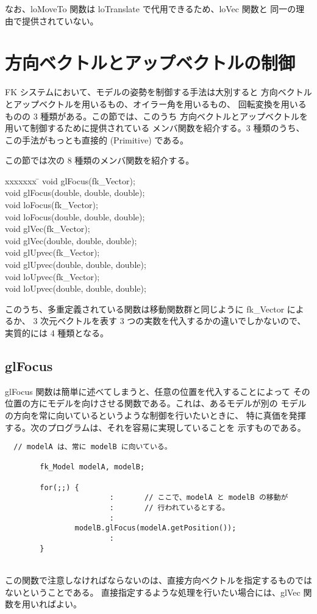 なお、loMoveTo 関数は loTranslate で代用できるため、loVec 関数と
同一の理由で提供されていない。
\section{方向ベクトルとアップベクトルの制御}
FK システムにおいて、モデルの姿勢を制御する手法は大別すると
方向ベクトルとアップベクトルを用いるもの、オイラー角を用いるもの、
回転変換を用いるものの 3 種類がある。この節では、このうち
方向ベクトルとアップベクトルを用いて制御するために提供されている
メンバ関数を紹介する。3 種類のうち、この手法がもっとも直接的
(Primitive) である。

この節では次の 8 種類のメンバ関数を紹介する。
\begin{bf}
\begin{tabbing}
xxxxxxx \= \kill
\> void glFocus(fk\_Vector); \\
\> void glFocus(double, double, double); \\
\> void loFocus(fk\_Vector); \\
\> void loFocus(double, double, double); \\
\> void glVec(fk\_Vector); \\
\> void glVec(double, double, double); \\
\> void glUpvec(fk\_Vector); \\
\> void glUpvec(double, double, double); \\
\> void loUpvec(fk\_Vector); \\
\> void loUpvec(double, double, double); \\
\end{tabbing}
\end{bf}
このうち、多重定義されている関数は移動関数群と同じように fk\_Vector によるか、
3 次元ベクトルを表す 3 つの実数を代入するかの違いでしかないので、
実質的には 4 種類となる。
\subsection{glFocus}
glFocus 関数は簡単に述べてしまうと、任意の位置を代入することによって
その位置の方にモデルを向けさせる関数である。これは、あるモデルが別の
モデルの方向を常に向いているというような制御を行いたいときに、
特に真価を発揮する。次のプログラムは、それを容易に実現していることを
示すものである。
\\
\begin{breakbox}
\begin{verbatim}
  // modelA は、常に modelB に向いている。

        fk_Model modelA, modelB;

        for(;;) {
                        :       // ここで、modelA と modelB の移動が
                        :       // 行われているとする。
                        :
                modelB.glFocus(modelA.getPosition());
                        :
        }
\end{verbatim}
\end{breakbox}
~ \\
この関数で注意しなければならないのは、直接方向ベクトルを指定するものでは
ないということである。
直接指定するような処理を行いたい場合には、glVec 関数を用いればよい。
